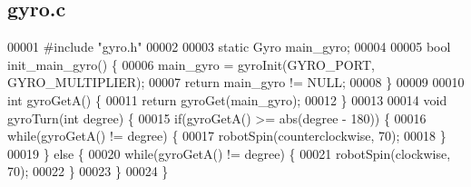 \subsection{gyro.\+c}
\label{gyro_8c_source}

\begin{DoxyCode}
00001 \textcolor{preprocessor}{#include "gyro.h"}
00002 
00003 \textcolor{keyword}{static} Gyro main\_gyro;
00004 
00005 \textcolor{keywordtype}{bool} init_main_gyro() \{
00006   main\_gyro = gyroInit(GYRO_PORT, GYRO_MULTIPLIER);
00007   \textcolor{keywordflow}{return} main\_gyro != NULL;
00008 \}
00009 
00010 \textcolor{keywordtype}{int} gyroGetA() \{
00011   \textcolor{keywordflow}{return} gyroGet(main\_gyro);
00012 \}
00013 
00014 \textcolor{keywordtype}{void} gyroTurn(\textcolor{keywordtype}{int} degree) \{
00015   \textcolor{keywordflow}{if}(gyroGetA() >= abs(degree - 180)) \{
00016     \textcolor{keywordflow}{while}(gyroGetA() != degree) \{
00017       robotSpin(counterclockwise, 70);
00018     \}
00019   \} \textcolor{keywordflow}{else} \{
00020     \textcolor{keywordflow}{while}(gyroGetA() != degree) \{
00021       robotSpin(clockwise, 70);
00022     \}
00023   \}
00024 \}
\end{DoxyCode}
